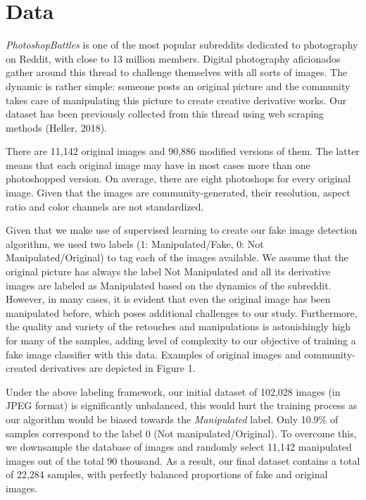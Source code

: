 \documentclass[11pt]{article}
\begin{document}
\section{Data}

{\it PhotoshopBattles} is one of the most popular subreddits dedicated to photography on Reddit, with close to 13 million members. Digital photography aficionados gather around this thread to challenge themselves with all sorts of images. The dynamic is rather simple: someone posts an original picture and the community takes care of manipulating this picture to create creative derivative works. Our dataset has been previously collected from this thread using web scraping methods (Heller, 2018).

There are 11,142 original images and 90,886 modified versions of them. The latter means that each original image may have in most cases more than one photoshopped version. On average, there are eight photoshops for every original image. Given that the images are community-generated, their resolution, aspect ratio and color channels are not standardized.

Given that we make use of supervised learning to create our fake image detection algorithm, we used two labels (1: Manipulated/Fake, 0: Not Manipulated/Original) to tag each of the images available. We assume that the original picture has always the label Not Manipulated and all its derivative images are labeled as Manipulated based on the dynamics of the subreddit. However, in many cases, it is evident that even the original image has been manipulated before, which poses additional challenges to our study. Furthermore, the quality and variety of the retouches and manipulations is astonishingly high for many of the samples, adding level of complexity to our objective of training a fake image classifier with this data. Examples of original images and community-created derivatives are depicted in Figure 1.

Under the above labeling framework, our initial dataset of 102,028 images (in JPEG format) is significantly unbalanced, this would hurt the training process as our algorithm would be biased towards the {\it Manipulated} label. Only 10.9\% of samples correspond to the label 0 (Not manipulated/Original). To overcome this, we downsample the database of images and randomly select 11,142 manipulated images out of the total 90 thousand. As a result, our final dataset contains a total of 22,284 samples,  with perfectly balanced proportions of fake and original images.
\end{document}
